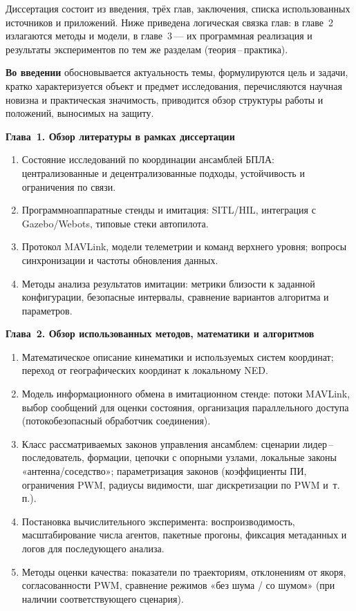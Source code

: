 \documentclass[12pt,a4paper]{article}
\begin{document}
Диссертация состоит из введения, трёх глав, заключения, списка
использованных источников и приложений. Ниже приведена логическая
связка глав: в главе~2 излагаются методы и модели, в главе~3\,---
их программная реализация и результаты экспериментов по тем же
разделам (теория\,--\,практика).

\textbf{Во введении} обосновывается актуальность темы, формулируются
цель и задачи, кратко характеризуется объект и предмет исследования,
перечисляются научная новизна и практическая значимость, приводится
обзор структуры работы и положений, выносимых на защиту.

\textbf{Глава~1. Обзор литературы в рамках диссертации}
\begin{enumerate}
  \item Состояние исследований по координации ансамблей БПЛА:
    централизованные и децентрализованные подходы, устойчивость
    и ограничения по связи.
  \item Программно\-аппаратные стенды и имитация: SITL/HIL,
    интеграция с Gazebo/Webots, типовые стеки автопилота.
  \item Протокол MAVLink, модели телеметрии и команд верхнего
    уровня; вопросы синхронизации и частоты обновления данных.
  \item Методы анализа результатов имитации: метрики близости
    к заданной конфигурации, безопасные интервалы, сравнение
    вариантов алгоритма и параметров.
\end{enumerate}

\textbf{Глава~2. Обзор использованных методов, математики и алгоритмов}
\begin{enumerate}
  \item Математическое описание кинематики и используемых систем
    координат; переход от географических координат к локальному NED.
  \item Модель информационного обмена в имитационном стенде:
    потоки MAVLink, выбор сообщений для оценки состояния,
    организация параллельного доступа (потокобезопасный обработчик
    соединения).
  \item Класс рассматриваемых законов управления ансамблем:
    сценарии лидер\,--\,последователь, формации, цепочки с опорными
    узлами, локальные законы «антенна/соседство»; параметризация
    законов (коэффициенты ПИ, ограничения PWM, радиусы видимости,
    шаг дискретизации по PWM и~т.\,п.).
  \item Постановка вычислительного эксперимента: воспроизводимость,
    масштабирование числа агентов, пакетные прогоны, фиксация
    метаданных и логов для последующего анализа.
  \item Методы оценки качества: показатели по траекториям, отклонениям
    от якоря, согласованности PWM, сравнение режимов «без шума /
    со шумом» (при наличии соответствующего сценария).
\end{enumerate}
\end{document}
